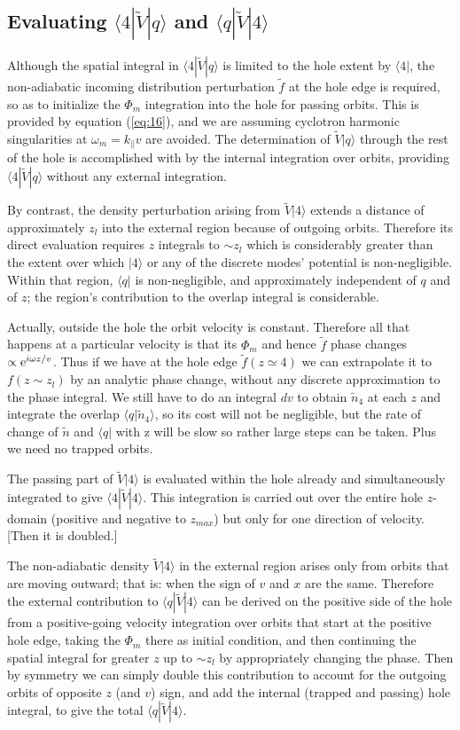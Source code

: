 \documentclass[12pt]{article}
\def\ket#1{|#1\rangle}
\def\bra#1{\langle#1}
\def\etothe#1{{\rm e}^{#1}}
\begin{document}
\subsection{Evaluating $\bra{4}|\tilde{V}\ket{q}$ and $\bra{q}|\tilde{V}\ket{4}$}

Although the spatial integral in $\bra{4}|\tilde{V}\ket{q}$ is limited
to the hole extent by $\bra{4}|$, the non-adiabatic incoming
distribution perturbation $\tilde f$ at the hole edge is required, so
as to initialize the $\Phi_m$ integration into the hole for passing
orbits. This is provided by equation (\ref{eq:16}), and we are
assuming cyclotron harmonic singularities at $\omega_m=k_\parallel v$
are avoided. The determination of $\tilde{V}\ket{q}$ through the rest
of the hole is accomplished with by the internal integration over
orbits, providing $\bra{4}|\tilde{V}\ket{q}$ without any external
integration.

By contrast, the density perturbation arising from $\tilde{V}\ket{4}$ extends a
distance of approximately $z_l$ into the external region because of
outgoing orbits. Therefore its direct evaluation requires $z$ integrals to
$\sim z_l$ which is considerably greater than the extent over which
$\ket{4}$ or any of the discrete modes' potential is non-negligible.
Within that
region, $\bra{q}|$ is non-negligible, and approximately independent of $q$ and
of $z$; the region's contribution to the overlap integral is considerable.

Actually, outside the hole the orbit velocity is constant. Therefore
all that happens at a particular velocity is that its $\Phi_m$ and hence
$\tilde f$ phase
changes $\propto \etothe{i\omega z/v}$. Thus if we have at the hole
edge $\tilde f(z\simeq4)$ we can extrapolate it to $f(z\sim z_l)$ by an
analytic phase change, without any discrete approximation to the phase
integral. We still have to do an integral $dv$ to obtain $\tilde n_4$
at each $z$ and integrate the overlap $\bra{q}\ket{\tilde n_4}$, so
its cost will not be negligible, but the rate of change of $\tilde n$
and $\bra{q}|$ with z will be slow so rather large steps can be
taken. Plus we need no trapped orbits.

The passing part of $\tilde V \ket{4}$ is evaluated within the hole
already and simultaneously integrated to give
$\bra{4}|\tilde V \ket{4}$. This integration is carried out over the
entire hole $z$-domain (positive and negative to $z_{max}$) but only
for one direction of velocity. [Then it is doubled.]

The non-adiabatic density $\tilde V \ket{4}$ in the external region
arises only from orbits that are moving outward; that is: when the
sign of $v$ and $x$ are the same. Therefore the external contribution
to $\bra{q}|\tilde V \ket{4}$ can be derived on the positive side of
the hole from a positive-going velocity integration over orbits that
start at the positive hole edge, taking the $\Phi_m$ there as initial
condition, and then continuing the spatial integral for greater $z$ up
to $\sim z_l$ by appropriately changing the phase.  Then by symmetry
we can simply double this contribution to account for the outgoing
orbits of opposite $z$ (and $v$) sign, and add the internal (trapped
and passing) hole integral, to give the total
$\bra{q}|\tilde V \ket{4}$.
\end{document}
